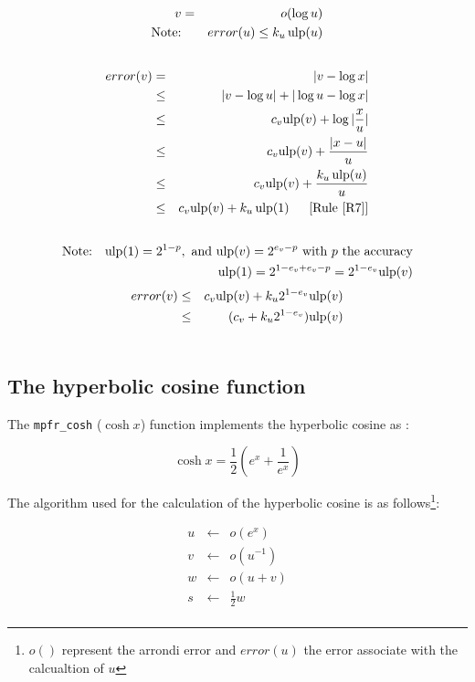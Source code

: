 \documentclass[12pt]{amsart}
\def\n{\textnormal}
\def\ulp{{\rm ulp}}
\newcommand{\U}[1]{\quad \mbox{[Rule~\ref{#1}]}}
\begin{document}
\begin{eqnarray}\nonumber
v&=&o(\log{u}) \\\nonumber
\textnormal{Note:}&& error(u) \leq k_u \, \ulp(u)\\\nonumber
\end{eqnarray}
\begin{eqnarray}\nonumber
error(v)& = &|v - \log{x}| \\\nonumber
& \leq &|v - \log{u}| +|\log{u} - \log{x}| \\\nonumber
& \leq & c_v \ulp(v) + \log{|\frac{x}{u}|} \\\nonumber
& \leq & c_v \ulp(v) + \frac{|x-u|}{u} \\\nonumber
& \leq & c_v \ulp(v) + \frac{k_u \, \ulp(u)}{u}\\\nonumber
& \leq & c_v \ulp(v) + k_u \, \ulp(1)\;\; \U{R7}\\\nonumber
\end{eqnarray}
\begin{eqnarray}\nonumber
\textnormal{Note:}&& \ulp(1)=2^{1-p}, \n{ and } \ulp(v)=2^{e_v-p} \n{ with } p \n{ the accuracy} \\\nonumber
&& \ulp(1)= 2^{1-e_v+e_v-p}=2^{1-e_v} \ulp(v)
\end{eqnarray}
\begin{eqnarray}\nonumber
error(v)& \leq & c_v \ulp(v) + k_u 2^{1-e_v} \ulp(v)\\\nonumber
& \leq & (c_v + k_u 2^{1-e_v} )\ulp(v)\\\nonumber
\end{eqnarray}

\subsection{The hyperbolic cosine function}

The {\tt mpfr\_cosh} ($\cosh{x}$) function implements the hyperbolic
cosine as :

$$
\cosh x = \frac{1}{2} \left( e^{x} + \frac{1}{e^x} \right) 
$$

The algorithm used for the calculation of the hyperbolic cosine is as follows\footnote{$o()$ represent the arrondi error and $error(u)$ the
  error associate with the calcualtion of $u$}:

\begin{eqnarray}\nonumber
u&\leftarrow&o(e^x)\\\label{coshalgo1}
v&\leftarrow&o({u}^{-1})\\\label{coshalgo2}
w&\leftarrow&o(u+v)\\\label{coshalgo3}
s&\leftarrow&\frac{1}{2} w\\\label{coshalgo4}
\end{eqnarray}
\end{document}
